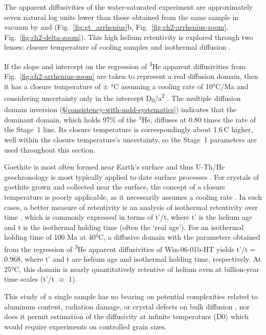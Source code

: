 The apparent diffusivities of the water-saturated experiment are approximately seven natural log units lower than
those obtained from the same sample in vacuum by \citet{monteiro2017} and \citet{farley2024} (Fig.~\ref{fig:gt_arrhenius}b,
Fig.~\ref{fig:ch2-arrhenius-zoom}, Fig.~\ref{fig:ch2-delta-zoom}). This high
helium retentivity is explored through two lenses: closure temperature
of cooling samples \citep{dodson1973} and isothermal diffusion \citep{wolf1998}.

If the slope and intercept on the regression of \textsuperscript{3}He apparent
diffusivities from Fig.~\ref{fig:ch2-arrhenius-zoom} are taken to represent a real
diffusion domain, then it has a closure temperature of \ChTwoTc ± \ChTwoTcErr °C assuming a cooling rate of 
10°C/Ma and considering uncertainty only in the intercept D\textsubscript{0}/a\textsuperscript{2} \citep{dodson1973}.
The multiple diffusion domain inversion (\S\ref{consistency-with-mdd-systematics}) indicates
that the dominant domain, which holds 97\% of the $^3$He, diffuses at 0.80 times the rate of
the Stage~1 line. Its closure temperature is correspondingly about 1.6\,\textdegree C higher,
well within the closure temperature's uncertainty, so the Stage~1 parameters are used throughout this section.

Goethite is most often formed near Earth's surface and thus U-Th/He geochronology
is most typically applied to date surface processes \citep{heim2006,yappshuster2011,vasconcelos2013,danisik2013,monteiro2014,hofmann2017,allard2018}. 
For crystals of goethite grown and collected near the surface, 
the concept of a closure temperature is poorly applicable, as
it necessarily assumes a cooling rate \citep{dodson1973}. In such cases, a
better measure of retentivity is an analysis of isothermal retentivity
over time \citep{wolf1998}, which is commonly expressed in terms of
t'/t, where t' is the helium age and t is the isothermal holding time
(often the `real age'). For an isothermal holding time of 100 Ma at
40°C, a diffusive domain with the parameters obtained from the
regression of \textsuperscript{3}He apparent diffusivities of Win-06-01b-HT yields t'/t = 0.968, 
where t' and t are helium age and isothermal holding time, respectively. At 25°C, this domain is nearly
quantitatively retentive of helium even at billion-year time scales (t'/t $\approx$ 1). 

This study of a single sample has no bearing on potential complexities
related to aluminum content, radiation damage, or crystal defects on bulk diffusion
\citep{bassal2022}, nor does it permit estimation of the diffusivity
at infinite temperature (D0) which would require experiments on controlled grain sizes.

